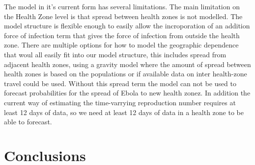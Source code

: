 \documentclass[12pt]{article}
\begin{document}
The model in it's current form has several limitations. The main limitation on the Health Zone level is that spread between health zones is not modelled. The model structure is flexible enough to easily allow the incroporation of an addition force of infection term that gives the force of infection from outside the health zone. There are multiple options for how to model the geographic dependence that woul all easily fit into our model structure, this includes spread from adjacent health zones, using a gravity model where the amount of spread between health zones is based on the populations or if available data on inter health-zone travel could be used. Without this spread term the model can not be used to forecast probabilities for the spread of Ebola to new health zonez. In addition the current way of estimating the time-varrying reproduction number requires at least 12 days of data, so we need at least 12 days of data in a health zone to be able to forecast.








\section{Conclusions}

\newpage

 

\end{document}
